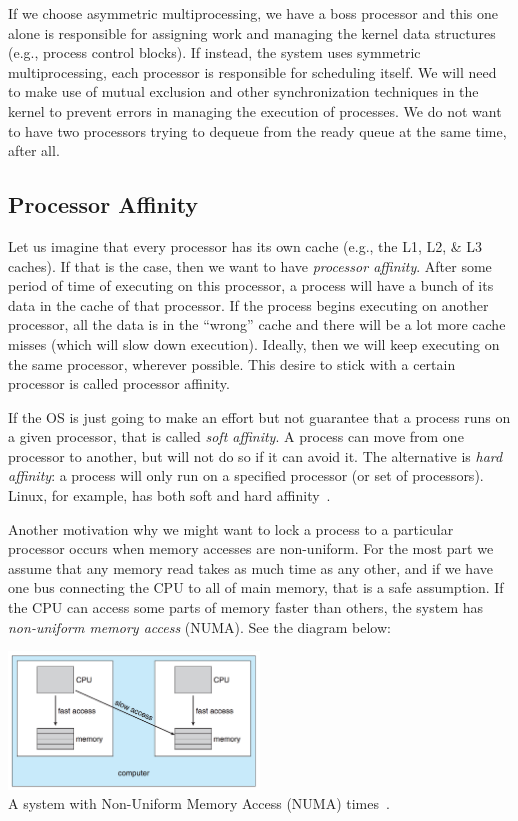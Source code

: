 If we choose asymmetric multiprocessing, we have a boss processor and this one alone is responsible for assigning work and managing the kernel data structures (e.g., process control blocks). If instead, the system uses symmetric multiprocessing, each processor is responsible for scheduling itself. We will need to make use of mutual exclusion and other synchronization techniques in the kernel to prevent errors in managing the execution of processes. We do not want to have two processors trying to dequeue from the ready queue at the same time, after all.

\subsection*{Processor Affinity}
Let us imagine that every processor has its own cache (e.g., the L1, L2, \& L3 caches). If that is the case, then we want to have \textit{processor affinity}. After some period of time of executing on this processor, a process will have a bunch of its data in the cache of that processor. If the process begins executing on another processor, all the data is in the ``wrong'' cache and there will be a lot more cache misses (which will slow down execution). Ideally, then we will keep executing on the same processor, wherever possible. This desire to stick with a certain processor is called processor affinity.

If the OS is just going to make an effort but not guarantee that a process runs on a given processor, that is called \textit{soft affinity}. A process can move from one processor to another, but will not do so if it can avoid it. The alternative is \textit{hard affinity}: a process will only run on a specified processor (or set of processors). Linux, for example, has both soft and hard affinity~\cite{osc}.

Another motivation why we might want to lock a process to a particular processor occurs when memory accesses are non-uniform. For the most part we assume that any memory read takes as much time as any other, and if we have one bus connecting the CPU to all of main memory, that is a safe assumption. If the CPU can access some parts of memory faster than others, the system has \textit{non-uniform memory access} (NUMA). See the diagram below:

\begin{center}
	\includegraphics[width=0.5\textwidth]{images/numa.png}\\
	A system with Non-Uniform Memory Access (NUMA) times~\cite{osc}.
\end{center}


